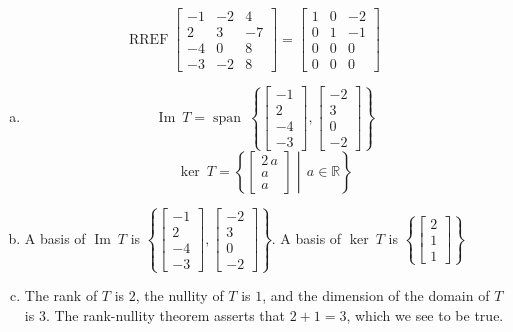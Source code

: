 \begin{exerciseAnswer} 


\[\operatorname{RREF} \left[\begin{array}{ccc}
-1 & -2 & 4 \\
2 & 3 & -7 \\
-4 & 0 & 8 \\
-3 & -2 & 8
\end{array}\right] = \left[\begin{array}{ccc}
1 & 0 & -2 \\
0 & 1 & -1 \\
0 & 0 & 0 \\
0 & 0 & 0
\end{array}\right] \]


\begin{enumerate}[(a)]
\item \[\operatorname{Im}\ T = \operatorname{span}\  \left\{ \left[\begin{array}{c}
-1 \\
2 \\
-4 \\
-3
\end{array}\right] , \left[\begin{array}{c}
-2 \\
3 \\
0 \\
-2
\end{array}\right] \right\} \]\[\operatorname{ker}\ T =  \left\{ \left[\begin{array}{c}
2 \, a \\
a \\
a
\end{array}\right] \middle|\,a\in\mathbb{R}\right\} \]
\item  A basis of \(\operatorname{Im}\ T\) is \( \left\{ \left[\begin{array}{c}
-1 \\
2 \\
-4 \\
-3
\end{array}\right] , \left[\begin{array}{c}
-2 \\
3 \\
0 \\
-2
\end{array}\right] \right\} \). A basis of \(\operatorname{ker}\ T\) is \( \left\{ \left[\begin{array}{c}
2 \\
1 \\
1
\end{array}\right] \right\} \)
\item  The rank of \(T\) is \( 2 \), the nullity of \(T\) is \( 1 \), and the dimension of the domain of \(T\) is \( 3 \). The rank-nullity theorem asserts that \( 2 + 1 = 3 \), which we see to be true. 
\end{enumerate}
    
\end{exerciseAnswer}
    
